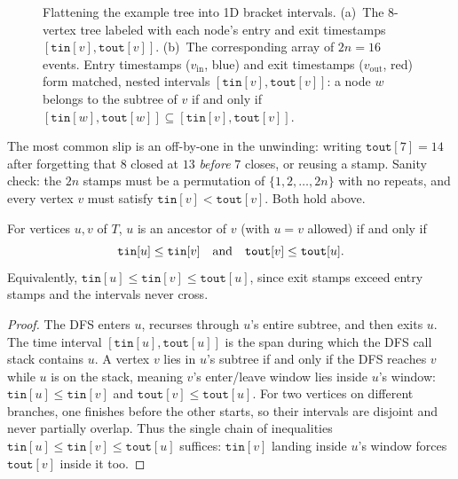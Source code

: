 \begin{figure}[htbp]
\caption{Flattening the example tree into 1D bracket intervals. (a)~The 8-vertex
tree labeled with each node's entry and exit timestamps $[\texttt{tin}[v], \texttt{tout}[v]]$.
(b)~The corresponding array of $2n=16$ events. Entry timestamps ($v_{\mathrm{in}}$, blue)
and exit timestamps ($v_{\mathrm{out}}$, red) form matched, nested intervals
$[\texttt{tin}[v], \texttt{tout}[v]]$: a node $w$ belongs to the subtree of $v$ if and only
if $[\texttt{tin}[w], \texttt{tout}[w]] \subseteq [\texttt{tin}[v], \texttt{tout}[v]]$.}
\label{ch21:fig-euler-bracket-intervals}
\end{figure}

\begin{trapbox}
The most common slip is an off-by-one in the unwinding: writing
$\texttt{tout}[7]=14$ after forgetting that $8$ closed at $13$ \emph{before} $7$
closes, or reusing a stamp. Sanity check: the $2n$ stamps
must be a permutation of $\{1,2,\dots,2n\}$ with no repeats, and every vertex $v$ must satisfy
$\texttt{tin}[v]<\texttt{tout}[v]$. Both hold above.
\end{trapbox}

\begin{theorem}
\label{ch21:thm-ancestor}
For vertices $u,v$ of $T$, $u$ is an ancestor of $v$ (with $u=v$ allowed) if and only
if
\[
\texttt{tin}[u]\le \texttt{tin}[v]\quad\textnormal{and}\quad \texttt{tout}[v]\le \texttt{tout}[u].
\]
Equivalently, $\texttt{tin}[u]\le\texttt{tin}[v]\le\texttt{tout}[u]$, since exit stamps
exceed entry stamps and the intervals never cross.
\end{theorem}

\begin{proof}
The DFS enters $u$, recurses through $u$'s entire subtree, and then exits $u$. The time
interval $[\texttt{tin}[u],\texttt{tout}[u]]$ is the span during which the
DFS call stack contains $u$. A vertex $v$ lies in $u$'s subtree if and only if the DFS reaches $v$ while
$u$ is on the stack, meaning $v$'s enter/leave window lies inside $u$'s
window: $\texttt{tin}[u]\le\texttt{tin}[v]$ and $\texttt{tout}[v]\le\texttt{tout}[u]$.
For two vertices on different branches, one finishes before the other starts, so their
intervals are disjoint and never partially overlap. Thus the single chain of inequalities
$\texttt{tin}[u]\le\texttt{tin}[v]\le\texttt{tout}[u]$ suffices:
$\texttt{tin}[v]$ landing inside $u$'s window forces $\texttt{tout}[v]$
inside it too.
\end{proof}

